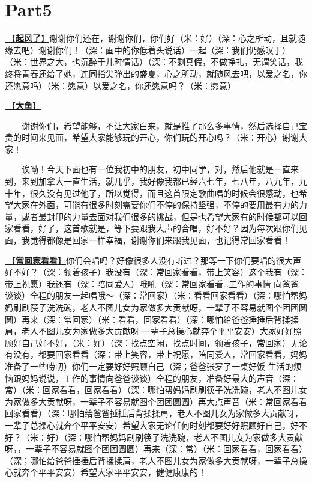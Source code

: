 \documentclass[]{ctexbook}
\begin{document}
\section{Part5}\label{Toronto-20250315-part5}

\hyperref[the-wind-rises]{🎵【\textbf{起风了}】}谢谢你们还在，谢谢你们，你们好（米：好）（深：心之所动，且就随缘去吧）谢谢你们！（深：画中的你低着头说话）一起（深：我们仍感叹于）（米：世界之大，也沉醉于儿时情话）（深：不剩真假，不做挣扎，无谓笑话，我终将青春还给了她，连同指尖弹出的盛夏，心之所动，就随风去吧，以爱之名，你还愿意吗）（米：愿意）以爱之名，你还愿意吗？（米：愿意）

\hyperref[big-fish]{🎵【\textbf{大鱼}】}

  谢谢你们，希望能够，不让大家白来，就是推了那么多事情，然后选择自己宝贵的时间来见面，希望大家能够玩的开心，你们玩的开心吗？（米：开心）谢谢大家！

  诶呦！今天下面也有一位我初中的朋友，初中同学，对，然后他就是一直来到，来到加拿大一直生活，就几乎，我好像我都已经六七年，七八年，八九年，九十年，很久没有见过他了，所以觉得，而且这首限定歌曲唱的时候会很感动，也希望大家在外面，可能有很多时刻需要你们不停的保持坚强，不停的要用最有力的力量，或者最封印的力量去面对我们很多的挑战，但是也希望大家有的时候都可以回家看看，好了，这首歌就是，等下要跟我大声的合唱，好不好？因为每次跟你们见面，我觉得都像是回家一样幸福，谢谢你们来跟我见面，也记得常回家看看！

\hyperref[often-back-home]{🎵【\textbf{常回家看看}】}你们会唱吗？好像很多人没有听过？那等一下你们要唱的很大声好不好？（深：领着孩子）我没有（深：常回家看看，带上笑容）这个我有（深：带上祝愿）我还有（深：陪同爱人）哦吼（深：常回家看看\ldots 工作的事情 向爸爸谈谈）全程的朋友一起唱哦～（深：常回家）（米：看看回家看看）（深：哪怕帮妈妈刷刷筷子洗洗碗，老人不图儿女为家做多大贡献呀，一辈子不容易就图个团团圆圆）再来（深：常回家）（米：看看，回家看看）（深：哪怕给爸爸捶捶后背揉揉肩，老人不图儿女为家做多大贡献呀 一辈子总操心就奔个平平安安）大家好好照顾好自己好不好，（米：好）（深：找点空闲，找点时间，领着孩子，常回家）无论有没有，都要回家看看（深：带上笑容，带上祝愿，陪同爱人，常回家看看，妈妈准备了一些唠叨）你们一定要好好照顾自己（深；爸爸张罗了一桌好饭 生活的烦恼跟妈妈说说，工作的事情向爸爸谈谈）全程的朋友，准备好最大的声音（深：常）（米：回家看看，回家看看）（深：哪怕帮妈妈刷刷筷子洗洗碗，老人不图儿女为家做多大贡献呀，一辈子不容易就图个团团圆圆）再大点声音（米：常回家看看 回家看看）（深：哪怕给爸爸捶捶后背揉揉肩，老人不图儿女为家做多大贡献呀，一辈子总操心就奔个平平安安）希望大家无论任何时刻都要好好照顾好自己，好不好？（米：好）（深：哪怕帮妈妈刷刷筷子洗洗碗，老人不图儿女为家做多大贡献呀，，一辈子不容易就图个团团圆圆）再来（深：常）（米：回家看看，回家看看）（深；哪怕给爸爸捶捶后背揉揉肩，老人不图儿女为家做多大贡献呀，一辈子总操心就奔个平平安安）希望大家平平安安，健健康康的！
\end{document}
